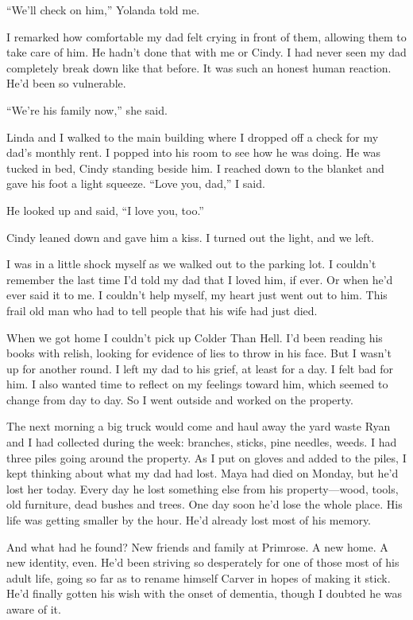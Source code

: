\documentclass[12pt]{book}
\begin{document}
``We'll check on him,'' Yolanda told me.

I remarked how comfortable my dad felt crying in front of them, allowing them to take care of him. He hadn't done that with me or Cindy. I had never seen my dad completely break down like that before. It was such an honest human reaction. He'd been so vulnerable.

``We're his family now,'' she said.

Linda and I walked to the main building where I dropped off a check for my dad's monthly rent. I popped into his room to see how he was doing. He was tucked in bed, Cindy standing beside him. I reached down to the blanket and gave his foot a light squeeze. ``Love you, dad,'' I said.

He looked up and said, ``I love you, too.''

Cindy leaned down and gave him a kiss. I turned out the light, and we left.

I was in a little shock myself as we walked out to the parking lot. I couldn't remember the last time I'd told my dad that I loved him, if ever. Or when he'd ever said it to me. I couldn't help myself, my heart just went out to him. This frail old man who had to tell people that his wife had just died.

When we got home I couldn't pick up Colder Than Hell. I'd been reading his books with relish, looking for evidence of lies to throw in his face. But I wasn't up for another round. I left my dad to his grief, at least for a day. I felt bad for him. I also wanted time to reflect on my feelings toward him, which seemed to change from day to day. So I went outside and worked on the property.

The next morning a big truck would come and haul away the yard waste Ryan and I had collected during the week: branches, sticks, pine needles, weeds. I had three piles going around the property. As I put on gloves and added to the piles, I kept thinking about what my dad had lost. Maya had died on Monday, but he'd lost her today. Every day he lost something else from his property---wood, tools, old furniture, dead bushes and trees. One day soon he'd lose the whole place. His life was getting smaller by the hour. He'd already lost most of his memory.

And what had he found? New friends and family at Primrose. A new home. A new identity, even. He'd been striving so desperately for one of those most of his adult life, going so far as to rename himself Carver in hopes of making it stick. He'd finally gotten his wish with the onset of dementia, though I doubted he was aware of it.
\end{document}
